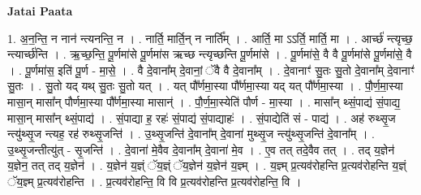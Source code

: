 \documentclass[17pt]{extarticle}
\begin{document}
\textbf{Jatai Paata} \newline

1. अ॒न॒न्ति॒ न नान॑ न्त्यनन्ति॒ न । . नार्ति॒ मार्ति॒न् न नार्ति᳚म् । . आर्ति॒ मा ऽऽर्ति॒ मार्ति॒ मा । . आर्च्छ॑ न्त्यृच्छ॒ न्त्यार्च्छ॑न्ति । . ऋ॒च्छ॒न्ति॒ पू॒र्णमा॑से पू॒र्णमा॑स ऋच्छ न्त्यृच्छन्ति पू॒र्णमा॑से । . पू॒र्णमा॑से॒ वै वै पू॒र्णमा॑से पू॒र्णमा॑से॒ वै । . पू॒र्णमा॑स॒ इति॑ पू॒र्ण - मा॒से॒ । . वै दे॒वाना᳚म् दे॒वानां॒ ॅवै वै दे॒वाना᳚म् । . दे॒वानाꣳ॑ सु॒तः सु॒तो दे॒वाना᳚म् दे॒वानाꣳ॑ सु॒तः । . सु॒तो यद् यथ् सु॒तः सु॒तो यत् । . यत् पौ᳚र्णमा॒स्या पौ᳚र्णमा॒स्या यद् यत् पौ᳚र्णमा॒स्या । . पौ॒र्ण॒मा॒स्या मासा॒न् मासा᳚न् पौर्णमा॒स्या पौ᳚र्णमा॒स्या मासान्॑ । . पौ॒र्ण॒मा॒स्येति॑ पौर्ण - मा॒स्या । . मासा᳚न् थ्सं॒पाद्य॑ सं॒पाद्य॒ मासा॒न् मासा᳚न् थ्सं॒पाद्य॑ । . सं॒पाद्या ह॒ रहः॑ सं॒पाद्य॑ सं॒पाद्याहः॑ । . सं॒पाद्येति॑ सं - पाद्य॑ । . अह॑ रुथ्सृ॒ज न्त्यु॑थ्सृ॒ज न्त्यह॒ रह॑ रुथ्सृ॒जन्ति॑ । . उ॒थ्सृ॒जन्ति॑ दे॒वाना᳚म् दे॒वाना॑ मुथ्सृ॒ज न्त्यु॑थ्सृ॒जन्ति॑ दे॒वाना᳚म् । . उ॒थ्सृ॒जन्तीत्यु॑त् - सृ॒जन्ति॑ । . दे॒वाना॑ मे॒वैव दे॒वाना᳚म् दे॒वाना॑ मे॒व । . ए॒व तत् तदे॒वैव तत् । . तद् य॒ज्ञेन॑ य॒ज्ञेन॒ तत् तद् य॒ज्ञेन॑ । . य॒ज्ञेन॑ य॒ज्ञ्ं ॅय॒ज्ञ्ं ॅय॒ज्ञेन॑ य॒ज्ञेन॑ य॒ज्ञ्म् । . य॒ज्ञ्म् प्र॒त्यव॑रोहन्ति प्र॒त्यव॑रोहन्ति य॒ज्ञ्ं ॅय॒ज्ञ्म् प्र॒त्यव॑रोहन्ति । . प्र॒त्यव॑रोहन्ति॒ वि वि प्र॒त्यव॑रोहन्ति प्र॒त्यव॑रोहन्ति॒ वि । \newline
\end{document}
